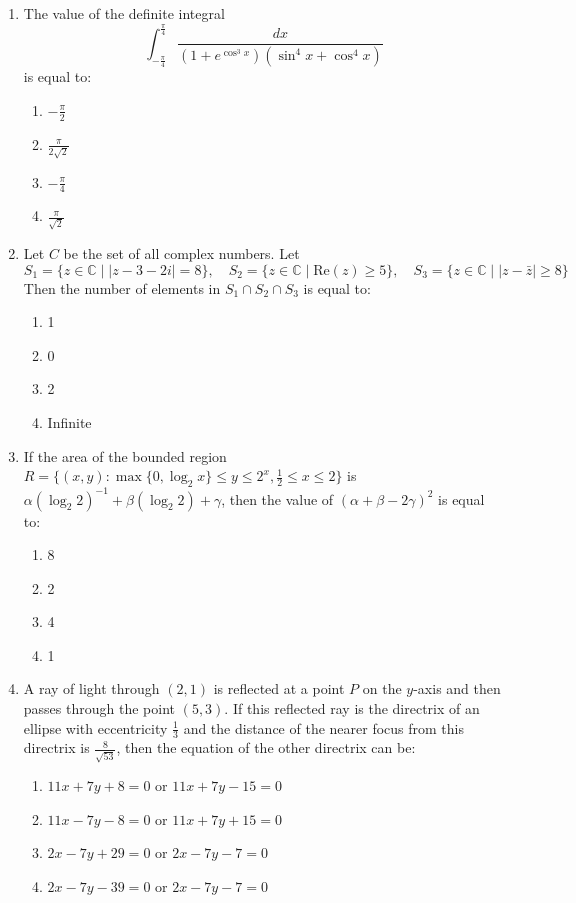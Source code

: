 \documentclass[journal]{IEEEtran}
\numberwithin{equation}{enumi}
\numberwithin{figure}{enumi}
\begin{document}
\begin{enumerate}
\item
The value of the definite integral
\begin{equation}
\int_{-\frac{\pi}{4}}^{\frac{\pi}{4}} \frac{dx}{(1 + e^{\cos^3 x})(\sin^4 x + \cos^4 x)}
\end{equation}
is equal to:
\begin{enumerate}
    \item $-\frac{\pi}{2}$
    \item $\frac{\pi}{2\sqrt{2}}$
    \item $-\frac{\pi}{4}$
    \item $\frac{\pi}{\sqrt{2}}$
\end{enumerate}

\item
Let $ C $ be the set of all complex numbers. Let  
$
S_1 = \{z \in \mathbb{C} \mid |z - 3 - 2i| = 8 \}, \quad
S_2 = \{z \in \mathbb{C} \mid \text{Re}(z) \geq 5\}, \quad
S_3 = \{z \in \mathbb{C} \mid |z - \bar{z}| \geq 8 \}
$
Then the number of elements in $ S_1 \cap S_2 \cap S_3 $ is equal to:
\begin{enumerate}
    \item 1
    \item 0
    \item 2
    \item Infinite
\end{enumerate}

\item
If the area of the bounded region
$
R = \{ (x, y) : \max\{0, \log_2 x\} \leq y \leq 2^x, \frac{1}{2} \leq x \leq 2\}
$
is $ \alpha(\log_2 2)^{-1} + \beta(\log_2 2) + \gamma $, then the value of
$
(\alpha + \beta - 2\gamma)^2
$
is equal to:
\begin{enumerate}
    \item 8
    \item 2
    \item 4
    \item 1
\end{enumerate}

\item
A ray of light through $ (2, 1) $ is reflected at a point $ P $ on the $ y $-axis and then passes through the point $ (5, 3) $. If this reflected ray is the directrix of an ellipse with eccentricity $ \frac{1}{3} $ and the distance of the nearer focus from this directrix is $ \frac{8}{\sqrt{53}} $, then the equation of the other directrix can be:
\begin{enumerate}
    \item $11x + 7y + 8 = 0$ or $11x + 7y - 15 = 0$
    \item $11x - 7y - 8 = 0$ or $11x + 7y + 15 = 0$
    \item $2x - 7y + 29 = 0$ or $2x - 7y - 7 = 0$
    \item $2x-7y-39=0$ or $2x-7y-7=0$
\end{enumerate}


\end{enumerate}
\end{document}
